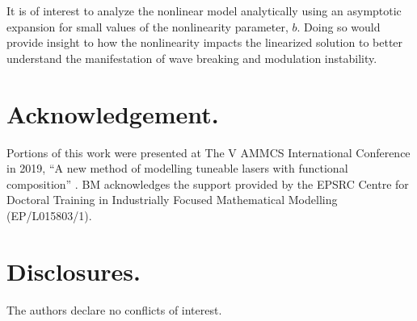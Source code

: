\documentclass[9pt,twocolumn,twoside]{osajnl}
\begin{document}
It is of interest to analyze the nonlinear model analytically using an asymptotic expansion for small values of the nonlinearity parameter, $b$. Doing so would provide insight to how the nonlinearity impacts the linearized solution to better understand the manifestation of wave breaking and modulation instability.

\section*{Acknowledgement.}

Portions of this work were presented at The V AMMCS International Conference in 2019, ``A new method of modelling tuneable lasers with functional composition'' \cite{metherallammcs}. BM acknowledges the support provided by the EPSRC Centre for Doctoral Training in Industrially Focused Mathematical Modelling (EP/L015803/1).

\section*{Disclosures.}
The authors declare no conflicts of interest.


\end{document}
